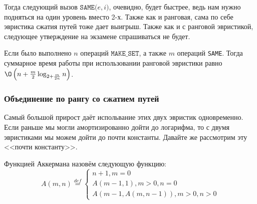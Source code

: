 \begin{figure}[H]
    \centering
\end{figure}

Тогда следующий вызов $\texttt{SAME(}e, i\texttt{)}$, очевидно, будет быстрее, ведь нам нужно подняться на один уровень вместо 2-х. 
Также как и ранговая, сама по себе эвристика сжатия путей тоже дает выигрыш. Также как и с ранговой эвристикой, следующее утверждение на экзамене спрашиваться не будет.

\ThBd Если было выполнено $n$ операций $\texttt{MAKE\_SET}$, а также $m$ операций \texttt{SAME}. Тогда суммарное время работы при использовании ранговой эвристики равно $\O\left(n + \frac{m}{2} \log_{2 + \frac{m}{2n}} n \right)$.

\subsubsection{Объединение по рангу со сжатием путей}

Самый большой прирост даёт испольвание этих двух эвристик одновременно. Если раньше мы могли амортизированно дойти до логарифма, то с двумя эвристиками мы можем дойти до почти константы.
Давайте же рассмотрим эту <<почти константу>>.

\Def Функцией Аккермана назовём следующую функцию:
\begin{equation*}
    A(m, n) \overset{def}{=} \begin{cases}
        n + 1, m = 0 \\
        A(m - 1, 1), m > 0, n = 0\\
        A(m - 1, A(m, n - 1)), m > 0, n > 0
    \end{cases}
\end{equation*}

